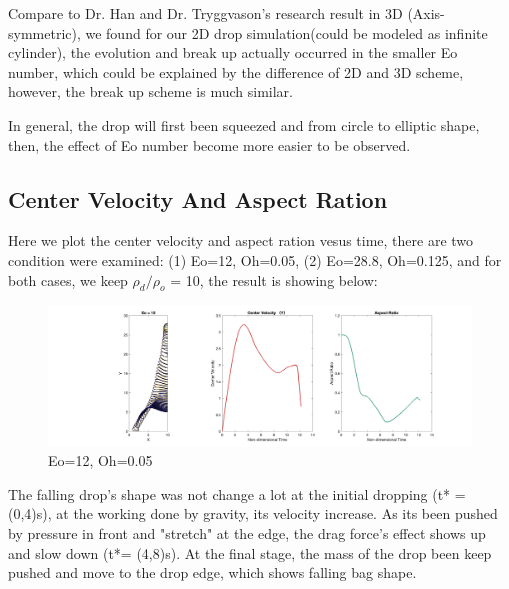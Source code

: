 \documentclass[12pt]{article}
\begin{document}
Compare to Dr. Han and Dr. Tryggvason's research result in 3D (Axis-symmetric), we found for our 2D drop simulation(could be modeled as infinite cylinder), the evolution and break up actually occurred in the smaller Eo number, which could be explained by the difference of 2D and 3D scheme, however, the break up scheme is much similar.









In general, the drop will first been squeezed and from circle to elliptic shape, then, the effect of Eo number become more easier to be observed. 








\subsection{Center Velocity And Aspect Ration}



Here we plot the center velocity and aspect ration vesus time, there are two condition were examined:  (1) Eo=12, Oh=0.05, (2) Eo=28.8, Oh=0.125, and for both cases, we keep $\rho_d/\rho_o$ = 10, the result is showing below:


\begin{figure}[H]
    \centering
    \includegraphics[width=\textwidth]{Latex/figures/All_Eo=12__t=0.28.png}
    \caption{Eo=12, Oh=0.05}
    \label{deformation}
\end{figure}

The falling drop's shape was not change a lot at the initial dropping (t* = (0,4)s), at the working done by gravity, its velocity increase. As its been pushed by pressure in front and "stretch" at the edge, the drag force's effect shows up and slow down (t*= (4,8)s). At the final stage, the mass of the drop been keep pushed and move to the drop edge, which shows falling bag shape.
\end{document}
